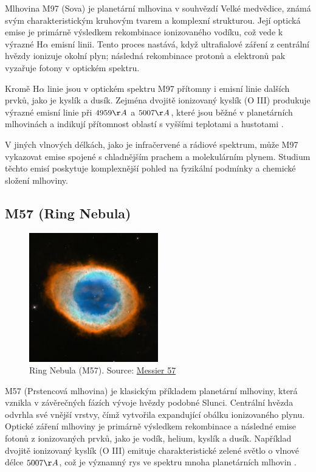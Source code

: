 \documentclass[a4paper,11pt,twocolumn]{article}
\begin{document}
            Mlhovina M97 (Sova) je planetární mlhovina v souhvězdí Velké medvědice, známá svým charakteristickým kruhovým tvarem a komplexní strukturou. Její optická emise je primárně výsledkem rekombinace ionizovaného vodíku, což vede k výrazné $\text{H} \alpha$ emisní linii. Tento proces nastává, když ultrafialové záření z centrální hvězdy ionizuje okolní plyn; následná rekombinace protonů a elektronů pak vyzařuje fotony v optickém spektru.

            Kromě $\text{H} \alpha$ linie jsou v optickém spektru M97 přítomny i emisní linie dalších prvků, jako je kyslík a dusík. Zejména dvojitě ionizovaný kyslík (O III) produkuje výrazné emisní linie při $4959 \AA$ a $5007 \AA$, které jsou běžné v planetárních mlhovinách a indikují přítomnost oblastí s vyššími teplotami a hustotami \citet{fesen2024}.
            
            V jiných vlnových délkách, jako je infračervené a rádiové spektrum, může M97 vykazovat emise spojené s chladnějším prachem a molekulárním plynem. Studium těchto emisí poskytuje komplexnější pohled na fyzikální podmínky a chemické složení mlhoviny.

        \subsection{M57 (Ring Nebula)}
            \begin{figure}
                \centering
                \includegraphics[width=0.5\textwidth]{M57.png}
                \caption{Ring Nebula (M57). Source: \href{https://science.nasa.gov/mission/hubble/science/explore-the-night-sky/hubble-messier-catalog/messier-57/}{Messier 57}}
                \label{fig:m57}
            \end{figure}

            M57 (Prstencová mlhovina) je klasickým příkladem planetární mlhoviny, která vznikla v závěrečných fázích vývoje hvězdy podobné Slunci. Centrální hvězda odvrhla své vnější vrstvy, čímž vytvořila expandující obálku ionizovaného plynu. Optické záření mlhoviny je primárně výsledkem rekombinace a následné emise fotonů z ionizovaných prvků, jako je vodík, helium, kyslík a dusík. Například dvojitě ionizovaný kyslík (O III) emituje charakteristické zelené světlo o vlnové délce $5007 \AA$, což je významný rys ve spektru mnoha planetárních mlhovin \citet{barker1987}.
            
\end{document}
